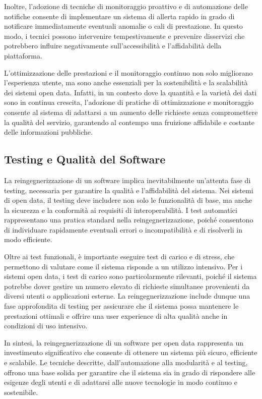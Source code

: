 Inoltre, l’adozione di tecniche di monitoraggio proattivo e di automazione delle notifiche consente di implementare un sistema di allerta rapido in grado di notificare immediatamente eventuali anomalie o cali di prestazione. In questo modo, i tecnici possono intervenire tempestivamente e prevenire disservizi che potrebbero influire negativamente sull’accessibilità e l’affidabilità della piattaforma.

L’ottimizzazione delle prestazioni e il monitoraggio continuo non solo migliorano l’esperienza utente, ma sono anche essenziali per la sostenibilità e la scalabilità dei sistemi open data. Infatti, in un contesto dove la quantità e la varietà dei dati sono in continua crescita, l’adozione di pratiche di ottimizzazione e monitoraggio consente al sistema di adattarsi a un aumento delle richieste senza compromettere la qualità del servizio, garantendo al contempo una fruizione affidabile e costante delle informazioni pubbliche.


\subsection{Testing e Qualità del Software}

La reingegnerizzazione di un software implica inevitabilmente un'attenta fase di testing, necessaria per garantire la qualità e l’affidabilità del sistema. Nei sistemi di open data, il testing deve includere non solo le funzionalità di base, ma anche la sicurezza e la conformità ai requisiti di interoperabilità. I test automatici rappresentano una pratica standard nella reingegnerizzazione, poiché consentono di individuare rapidamente eventuali errori o incompatibilità e di risolverli in modo efficiente.

Oltre ai test funzionali, è importante eseguire test di carico e di stress, che permettono di valutare come il sistema risponde a un utilizzo intensivo. Per i sistemi open data, i test di carico sono particolarmente rilevanti, poiché il sistema potrebbe dover gestire un numero elevato di richieste simultanee provenienti da diversi utenti o applicazioni esterne. La reingegnerizzazione include dunque una fase approfondita di testing per assicurare che il sistema possa mantenere le prestazioni ottimali e offrire una user experience di alta qualità anche in condizioni di uso intensivo.

In sintesi, la reingegnerizzazione di un software per open data rappresenta un investimento significativo che consente di ottenere un sistema più sicuro, efficiente e scalabile. Le tecniche descritte, dall'automazione alla modularità e al testing, offrono una base solida per garantire che il sistema sia in grado di rispondere alle esigenze degli utenti e di adattarsi alle nuove tecnologie in modo continuo e sostenibile.

